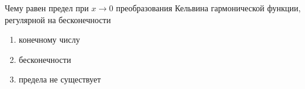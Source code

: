 Чему равен предел при \(x \to 0\) преобразования Кельвина гармонической функции, регулярной на бесконечности

\begin{enumerate}[label=\arabic*)]
    \item конечному числу
    \item бесконечности
    \item предела не существует
\end{enumerate}

